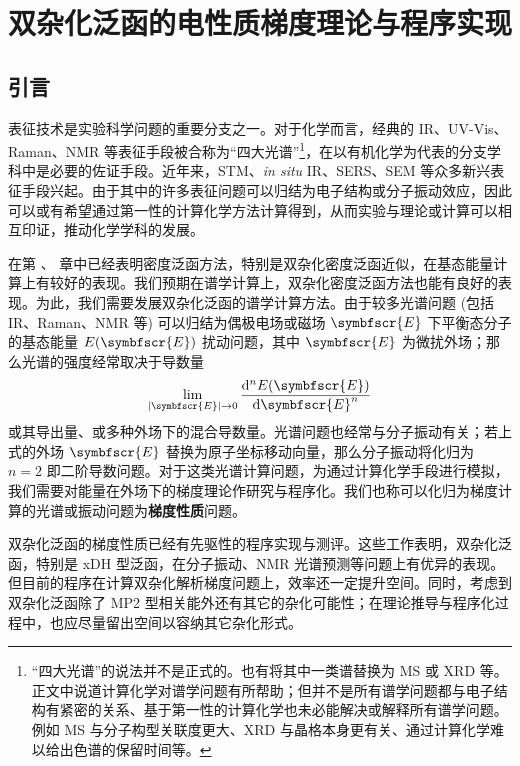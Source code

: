 
\chapter{双杂化泛函的电性质梯度理论与程序实现}
\label{sec.3.title}

\section{引言}

表征技术是实验科学问题的重要分支之一。对于化学而言，经典的 IR、UV-Vis、Raman、NMR 等表征手段被合称为“四大光谱”\footnote{“四大光谱”的说法并不是正式的。也有将其中一类谱替换为 MS 或 XRD 等。正文中说道计算化学对谱学问题有所帮助；但并不是所有谱学问题都与电子结构有紧密的关系、基于第一性的计算化学也未必能解决或解释所有谱学问题。例如 MS 与分子构型关联度更大、XRD 与晶格本身更有关、通过计算化学难以给出色谱的保留时间等。}，在以有机化学为代表的分支学科中是必要的佐证手段。近年来，STM、\emph{in situ} IR、SERS、SEM 等众多新兴表征手段兴起。由于其中的许多表征问题可以归结为电子结构或分子振动效应，因此可以或有希望通过第一性的计算化学方法计算得到，从而实验与理论或计算可以相互印证，推动化学学科的发展。

在第 、 章中已经表明密度泛函方法，特别是双杂化密度泛函近似，在基态能量计算上有较好的表现。我们预期在谱学计算上，双杂化密度泛函方法也能有良好的表现。为此，我们需要发展双杂化泛函的谱学计算方法。由于较多光谱问题 (包括 IR、Raman、NMR 等) 可以归结为偶极电场或磁场 $\symbfscr{E}$ 下平衡态分子的基态能量 $E(\symbfscr{E})$ 扰动问题，其中 $\symbfscr{E}$ 为微扰外场；那么光谱的强度经常取决于导数量
\begin{equation}
    \lim_{|\symbfscr{E}| \rightarrow 0} \frac{\mathrm{d}^n E(\symbfscr{E})}{\mathrm{d} \symbfscr{E}^n}
\end{equation}
或其导出量、或多种外场下的混合导数量。光谱问题也经常与分子振动有关；若上式的外场 $\symbfscr{E}$ 替换为原子坐标移动向量，那么分子振动将化归为 $n = 2$ 即二阶导数问题。对于这类光谱计算问题，为通过计算化学手段进行模拟，我们需要对能量在外场下的梯度理论作研究与程序化。我们也称可以化归为梯度计算的光谱或振动问题为\textbf{梯度性质}问题。

双杂化泛函的梯度性质已经有先驱性的程序实现与测评\cite{Neese-Grimme.JCP.2007, Biczysko-Barone.JCTC.2010, Su-Xu.JCC.2013, Stoychev-Neese.JCTC.2018, Yan-Xu.JCTC.2022}。这些工作表明，双杂化泛函，特别是 xDH 型泛函，在分子振动、NMR 光谱预测等问题上有优异的表现。但目前的程序在计算双杂化解析梯度问题上，效率还一定提升空间。同时，考虑到双杂化泛函除了 MP2 型相关能外还有其它的杂化可能性；在理论推导与程序化过程中，也应尽量留出空间以容纳其它杂化形式。

